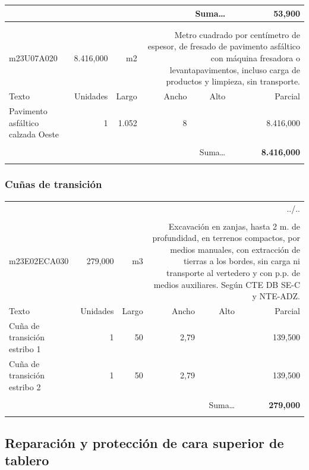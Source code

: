 \documentclass{book}%
\begin{document}
\begin{longtable}{lrrrrr}
\multicolumn{5}{r}{Suma\ldots}&\textbf{    53,900}\\%
\hline%
&&&&&\\%
&&&&&\\%
m23U07A020& 8.416,000& m2&\multicolumn{3}{p{6cm}}{\scriptsize Metro cuadrado por centímetro de espesor, de fresado de pavimento asfáltico con máquina fresadora o levantapavimentos, incluso carga de productos y limpieza, sin transporte.\normalsize}\\%
Texto&Unidades&Largo&Ancho&Alto&Parcial\\%
\hline%
\multicolumn{1}{p{3.5cm}}{Pavimento asfáltico calzada Oeste}&1&1.052&8&& 8.416,000\\%
&&&&&\\%
\multicolumn{5}{r}{Suma\ldots}&\textbf{ 8.416,000}\\%
\hline%
&&&&&\\%
\end{longtable}%
\newpage

%
\subsubsection{Cuñas de transición}%
\begin{longtable}{lrrrrr}%
\multicolumn{6}{r}{../..}\\%
\endfoot%
\endlastfoot%
&&&&&\\%
m23E02ECA030&   279,000& m3&\multicolumn{3}{p{6cm}}{\scriptsize Excavación en zanjas, hasta 2 m. de profundidad, en terrenos compactos, por medios manuales, con extracción de tierras a los bordes, sin carga ni transporte al vertedero y con p.p. de medios auxiliares. Según CTE DB SE-C y NTE-ADZ.\normalsize}\\%
Texto&Unidades&Largo&Ancho&Alto&Parcial\\%
\hline%
\multicolumn{1}{p{3.5cm}}{Cuña de transición estribo 1}&1&50&2,79&&   139,500\\%
\multicolumn{1}{p{3.5cm}}{Cuña de transición estribo 2}&1&50&2,79&&   139,500\\%
&&&&&\\%
\multicolumn{5}{r}{Suma\ldots}&\textbf{   279,000}\\%
\hline%
&&&&&\\%
\end{longtable}%
\newpage

%
\subsection{Reparación y protección de cara superior de tablero}%
\end{document}
